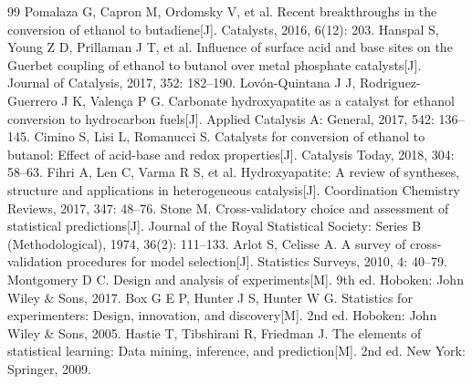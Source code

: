 \begin{thebibliography}{99}
   Pomalaza G, Capron M, Ordomsky V, et al. Recent breakthroughs in the conversion of ethanol to butadiene[J]. Catalysts, 2016, 6(12): 203.
   Hanspal S, Young Z D, Prillaman J T, et al. Influence of surface acid and base sites on the Guerbet coupling of ethanol to butanol over metal phosphate catalysts[J]. Journal of Catalysis, 2017, 352: 182--190.
   Lov\'on-Quintana J J, Rodriguez-Guerrero J K, Valen\c{c}a P G. Carbonate hydroxyapatite as a catalyst for ethanol conversion to hydrocarbon fuels[J]. Applied Catalysis A: General, 2017, 542: 136--145.
   Cimino S, Lisi L, Romanucci S. Catalysts for conversion of ethanol to butanol: Effect of acid-base and redox properties[J]. Catalysis Today, 2018, 304: 58--63.
   Fihri A, Len C, Varma R S, et al. Hydroxyapatite: A review of syntheses, structure and applications in heterogeneous catalysis[J]. Coordination Chemistry Reviews, 2017, 347: 48--76.
   Stone M. Cross-validatory choice and assessment of statistical predictions[J]. Journal of the Royal Statistical Society: Series B (Methodological), 1974, 36(2): 111--133.
   Arlot S, Celisse A. A survey of cross-validation procedures for model selection[J]. Statistics Surveys, 2010, 4: 40--79.
   Montgomery D C. Design and analysis of experiments[M]. 9th ed. Hoboken: John Wiley \& Sons, 2017.
   Box G E P, Hunter J S, Hunter W G. Statistics for experimenters: Design, innovation, and discovery[M]. 2nd ed. Hoboken: John Wiley \& Sons, 2005.
   Hastie T, Tibshirani R, Friedman J. The elements of statistical learning: Data mining, inference, and prediction[M]. 2nd ed. New York: Springer, 2009.
\end{thebibliography}
